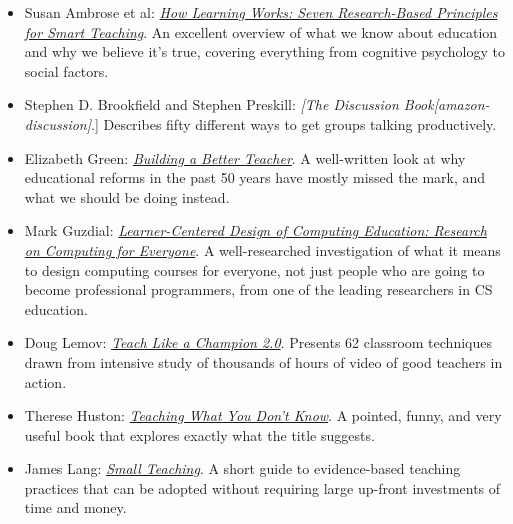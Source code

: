 
\begin{itemize}

\item
  Susan Ambrose et al:
\emph{\href{http://www.amazon.com/How-Learning-Works-Research-Based-Jossey-Bass/dp/0470484101/}{How
Learning Works: Seven Research-Based Principles for Smart Teaching}}.
An excellent overview of what we know about education and why we believe
it's true, covering everything from cognitive psychology to social
factors.

\item
  Stephen D. Brookfield and Stephen Preskill: \emph{{[}The
Discussion Book{}{[}amazon-discussion{]}}.]
Describes fifty different ways to get groups talking productively.

\item
  Elizabeth Green:
\emph{\href{http://www.amazon.com/Building-Better-Teacher-Teaching-Everyone/dp/0393081591}{Building
a Better Teacher}}.
A well-written look at why educational reforms in the past 50 years have
mostly missed the mark, and what we should be doing instead.

\item
  Mark Guzdial:
\emph{\href{http://www.amazon.com/Learner-Centered-Design-Computing-Education-Human-Centered/dp/1627053514/}{Learner-Centered
Design of Computing Education: Research on Computing for Everyone}}.
A well-researched investigation of what it means to design computing
courses for everyone, not just people who are going to become
professional programmers, from one of the leading researchers in CS
education.

\item
  Doug Lemov:
\emph{\href{http://www.amazon.com/Teach-Like-Champion-2-0-Techniques/dp/1118901851/}{Teach
Like a Champion 2.0}}.
Presents 62 classroom techniques drawn from intensive study of thousands
of hours of video of good teachers in action.

\item
  Therese Huston:
\emph{\href{http://www.amazon.com/Teaching-What-You-Dont-Know/dp/0674066170/}{Teaching
What You Don't Know}}.
A pointed, funny, and very useful book that explores exactly what the
title suggests.

\item
  James Lang:
\emph{\href{https://www.amazon.com/Small-Teaching-Everyday-Lessons-Learning/dp/1118944496/}{Small
Teaching}}.
A short guide to evidence-based teaching practices that can be adopted
without requiring large up-front investments of time and money.


\end{itemize}
